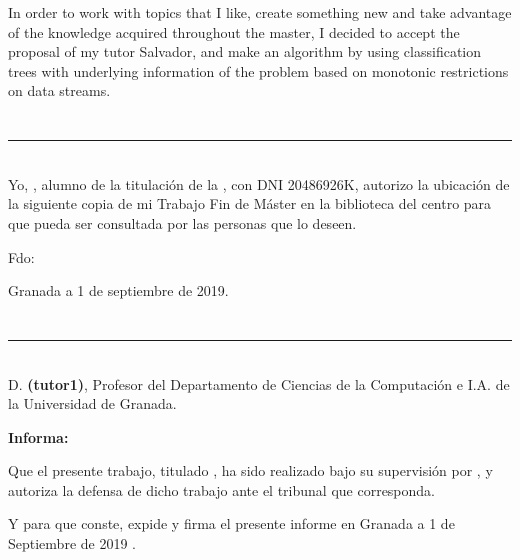 In order to work with topics that I like, create something new and take advantage of the knowledge acquired throughout the master, I decided to accept the proposal of my tutor Salvador, and make an algorithm by using classification trees with underlying information of the problem based on monotonic restrictions on data streams.

\chapter*{}
\thispagestyle{empty}

\noindent\rule[-1ex]{\textwidth}{2pt}\\[4.5ex]

Yo, \textbf{\myName}, alumno de la titulación \myDegree de la \textbf{\myFaculty}, con DNI 20486926K, autorizo la
ubicación de la siguiente copia de mi Trabajo Fin de Máster en la biblioteca del centro para que pueda ser
consultada por las personas que lo deseen.

\vspace{6cm}

\noindent Fdo: \myName

\vspace{2cm}

\begin{flushright}
Granada a 1 de septiembre de 2019.
\end{flushright}


\chapter*{}
\thispagestyle{empty}

\noindent\rule[-1ex]{\textwidth}{2pt}\\[4.5ex]

D. \textbf{\myProf (tutor1)}, Profesor del Departamento de Ciencias de la Computación e I.A. de la Universidad de Granada.

\vspace{0.5cm}

\textbf{Informa:}

\vspace{0.5cm}

Que el presente trabajo, titulado \textit{\textbf{\myTitle}},
ha sido realizado bajo su supervisión por \textbf{\myName}, y autoriza la defensa de dicho trabajo ante el tribunal que corresponda.

\vspace{0.5cm}

Y para que conste, expide y firma el presente informe en Granada a 1 de Septiembre de 2019 .

